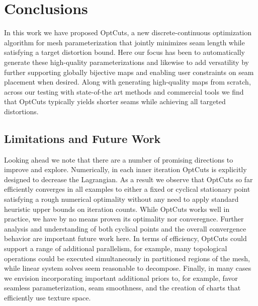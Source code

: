 
\section{Conclusions}
\label{sec:conclusion}

In this work we have proposed OptCuts, a new discrete-continuous optimization algorithm for mesh parameterization that jointly minimizes seam length while satisfying a target distortion bound. Here our focus has been to automatically generate these high-quality parameterizations and likewise to add versatility by further supporting globally bijective maps and enabling user constraints on seam placement when desired. Along with generating high-quality maps from scratch, across our testing with state-of-the art methods and commercial tools we find that OptCuts typically yields shorter seams while achieving all targeted distortions.

\subsection{Limitations and Future Work}

Looking ahead we note that there are a number of promising directions to improve and explore. Numerically, in each inner iteration OptCuts is explicitly designed to decrease the Lagrangian. As a result we observe that OptCuts so far efficiently converges in all examples to either a fixed or cyclical stationary point satisfying a rough numerical optimality without any need to apply standard heuristic upper bounds on iteration counts. While OptCuts works well in practice, we have by no means proven its optimality nor converegnce. 
Further analysis and understanding of both cyclical points and the overall convergence behavior are important future work here. 
In terms of efficiency, OptCuts could support a range of additional parallelism, for example, many topological operations could be executed simultaneously in partitioned regions of the mesh, while linear system solves seem reasonable to decompose. 
Finally, in many cases we envision incorporating important additional priors to, for example, favor seamless parameterization, seam smoothness, and the creation of charts that efficiently use texture space. 

